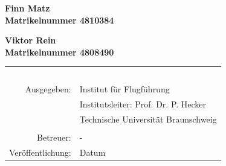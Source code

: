 \begin{titlepage}
 \textbf{\large Finn Matz} \\[0.5ex]
 \textbf{Matrikelnummer 4810384}

 \textbf{\large Viktor Rein} \\[0.5ex]
 \textbf{Matrikelnummer 4808490}
 

 

 



 \vspace*{2.5cm}

 \begin{table}[htbp]
  \begin{center}
   \begin{tabular}{rl} 
     \parbox{0.33\textwidth}{\mbox{ }} & \parbox{0.66\textwidth}{\mbox{ }} \\
     Ausgegeben: & Institut f\" ur Flugf\" uhrung \\
                 & Institutsleiter: Prof. Dr. P. Hecker \\
                 & Technische Universit\"at Braunschweig \\
                 &  \\
       Betreuer: & -\\
 Ver\"offentlichung: & Datum \\
   \end{tabular}
  \end{center}
 \end{table}



\end{titlepage}

